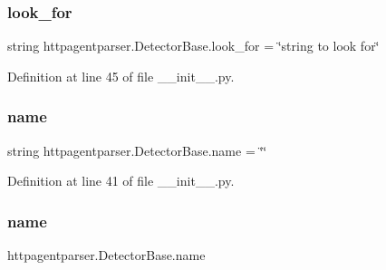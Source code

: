 \hypertarget{classhttpagentparser_1_1_detector_base_a4587aa94d3e88cc0514265d11cc1ea40}{}\label{classhttpagentparser_1_1_detector_base_a4587aa94d3e88cc0514265d11cc1ea40} 
\subsubsection{\texorpdfstring{look\+\_\+for}{look\_for}}
{\footnotesize\ttfamily string httpagentparser.\+Detector\+Base.\+look\+\_\+for = \char`\"{}string to look for\char`\"{}\hspace{0.3cm}{\ttfamily [static]}}



Definition at line 45 of file \+\_\+\+\_\+init\+\_\+\+\_\+.\+py.

\hypertarget{classhttpagentparser_1_1_detector_base_ab5f0a41981b98396b593d44a981a77bc}{}\label{classhttpagentparser_1_1_detector_base_ab5f0a41981b98396b593d44a981a77bc} 
\subsubsection{\texorpdfstring{name}{name}\hspace{0.1cm}{\footnotesize\ttfamily [1/2]}}
{\footnotesize\ttfamily string httpagentparser.\+Detector\+Base.\+name = \char`\"{}\char`\"{}\hspace{0.3cm}{\ttfamily [static]}}



Definition at line 41 of file \+\_\+\+\_\+init\+\_\+\+\_\+.\+py.

\hypertarget{classhttpagentparser_1_1_detector_base_a7895d7f0a2aae86cb5381e74cb1a413e}{}\label{classhttpagentparser_1_1_detector_base_a7895d7f0a2aae86cb5381e74cb1a413e} 
\subsubsection{\texorpdfstring{name}{name}\hspace{0.1cm}{\footnotesize\ttfamily [2/2]}}
{\footnotesize\ttfamily httpagentparser.\+Detector\+Base.\+name}



